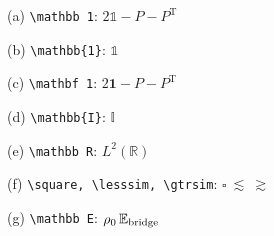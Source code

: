 \documentclass[11pt,a4paper]{article}
\begin{document}
\Large
(a) \verb|\mathbb 1|: $2\mathbb 1 - P - P^{\mathrm T}$\par
(b) \verb|\mathbb{1}|: $\mathbb{1}$\par
(c) \verb|\mathbf 1|: $2\mathbf 1 - P - P^{\mathrm T}$\par
(d) \verb|\mathbb{I}|: $\mathbb{I}$\par
(e) \verb|\mathbb R|: $L^2(\mathbb R)$\par
(f) \verb|\square, \lesssim, \gtrsim|: $\square\ \lesssim\ \gtrsim$\par
(g) \verb|\mathbb E|: $\rho_0\,\mathbb E_{\rm bridge}$\par
\end{document}
